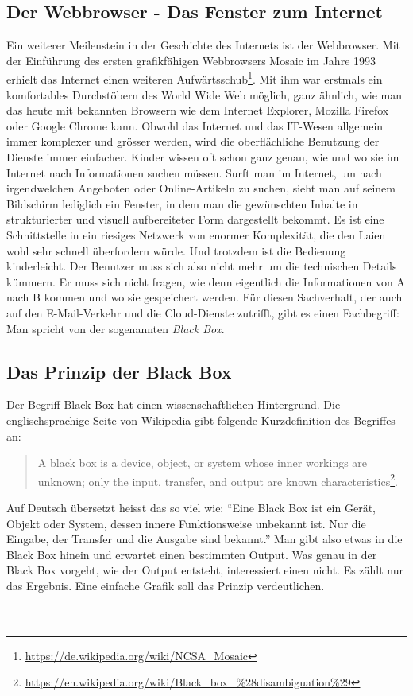 \subsection{Der Webbrowser - Das Fenster zum Internet}
Ein weiterer Meilenstein in der Geschichte des Internets ist der Webbrowser. Mit der Einführung des ersten grafikfähigen Webbrowsers Mosaic im Jahre 1993 erhielt das Internet einen weiteren Aufwärtsschub\footnote{\url{https://de.wikipedia.org/wiki/NCSA_Mosaic}}.
Mit ihm war erstmals ein komfortables Durchstöbern des World Wide Web möglich, ganz ähnlich, wie man das heute mit bekannten Browsern wie dem Internet Explorer, Mozilla Firefox oder Google Chrome kann. Obwohl das Internet und das IT-Wesen allgemein immer komplexer und grösser werden, wird die oberflächliche Benutzung der Dienste immer einfacher. Kinder wissen oft schon ganz genau, wie und wo sie im Internet nach Informationen suchen müssen. Surft man im Internet, um nach irgendwelchen Angeboten oder Online-Artikeln zu suchen, sieht man auf seinem Bildschirm lediglich ein Fenster, in dem man die gewünschten Inhalte in strukturierter und visuell aufbereiteter Form dargestellt bekommt. Es ist eine Schnittstelle in ein riesiges Netzwerk von enormer Komplexität, die den Laien wohl sehr schnell überfordern würde. Und trotzdem ist die Bedienung kinderleicht. Der Benutzer muss sich also nicht mehr um die technischen Details kümmern. Er muss sich nicht fragen, wie denn eigentlich die Informationen von A nach B kommen und wo sie gespeichert werden. Für diesen Sachverhalt, der auch auf den E-Mail-Verkehr und die Cloud-Dienste zutrifft, gibt es einen Fachbegriff: Man spricht von der sogenannten \textit{Black Box}.

\subsection{Das Prinzip der Black Box}
Der Begriff Black Box hat einen wissenschaftlichen Hintergrund. Die englischsprachige Seite von Wikipedia gibt folgende Kurzdefinition des Begriffes an:

\begin{quote}
A black box is a device, object, or system whose inner workings are unknown; only the input, transfer, and output are known characteristics\footnote{\url{https://en.wikipedia.org/wiki/Black_box_\%28disambiguation\%29}}.
\end{quote}

Auf Deutsch übersetzt heisst das so viel wie: ``Eine Black Box ist ein Gerät, Objekt oder System, dessen innere Funktionsweise unbekannt ist. Nur die Eingabe, der Transfer und die Ausgabe sind bekannt.''
Man gibt also etwas in die Black Box hinein und erwartet einen bestimmten Output. Was genau in der Black Box vorgeht, wie der Output entsteht, interessiert einen nicht. Es zählt nur das Ergebnis. Eine einfache Grafik soll das Prinzip verdeutlichen. 
\\
\\
\\

